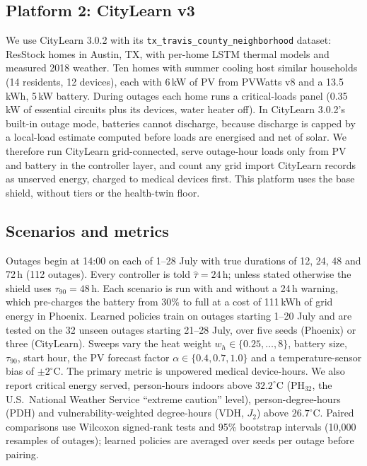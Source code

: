 \documentclass[conference]{IEEEtran}
\begin{document}
\subsection{Platform 2: CityLearn v3}
We use CityLearn 3.0.2 \cite{fonseca2026citylearnv3,nweye2025citylearn} with its \texttt{tx\_travis\_county\_neighborhood} dataset: ResStock homes in Austin, TX, with per-home LSTM thermal models and measured 2018 weather. Ten homes with summer cooling host similar households (14 residents, 12 devices), each with 6\,kW of PV from PVWatts v8 \cite{dobos2014pvwatts} and a 13.5\,kWh, 5\,kW battery. During outages each home runs a critical-loads panel (0.35\,kW of essential circuits plus its devices, water heater off). In CityLearn 3.0.2's built-in outage mode, batteries cannot discharge, because discharge is capped by a local-load estimate computed before loads are energised and net of solar. We therefore run CityLearn grid-connected, serve outage-hour loads only from PV and battery in the controller layer, and count any grid import CityLearn records as unserved energy, charged to medical devices first. This platform uses the base shield, without tiers or the health-twin floor.

\subsection{Scenarios and metrics}
Outages begin at 14:00 on each of 1--28 July with true durations of 12, 24, 48 and 72\,h (112 outages). Every controller is told $\hat\tau=24$\,h; unless stated otherwise the shield uses $\tau_{90}=48$\,h. Each scenario is run with and without a 24\,h warning, which pre-charges the battery from 30\% to full at a cost of 111\,kWh of grid energy in Phoenix. Learned policies train on outages starting 1--20 July and are tested on the 32 unseen outages starting 21--28 July, over five seeds (Phoenix) or three (CityLearn). Sweeps vary the heat weight $w_h\in\{0.25,\dots,8\}$, battery size, $\tau_{90}$, start hour, the PV forecast factor $\alpha\in\{0.4,0.7,1.0\}$ and a temperature-sensor bias of $\pm2^\circ$C. The primary metric is unpowered medical device-hours. We also report critical energy served, person-hours indoors above $32.2^\circ$C (PH$_{32}$, the U.S.\ National Weather Service ``extreme caution'' level), person-degree-hours (PDH) and vulnerability-weighted degree-hours (VDH, $J_2$) above $26.7^\circ$C. Paired comparisons use Wilcoxon signed-rank tests and 95\% bootstrap intervals (10,000 resamples of outages); learned policies are averaged over seeds per outage before pairing.
\end{document}
